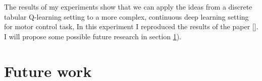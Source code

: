 \documentclass[conference]{IEEEtran}
\begin{document}
The results of my experiments show that we can apply the ideas from a discrete tabular Q-learning setting to a more complex, continuous deep learning setting for motor control task, In this experiment I reproduced the results of the paper [\cite{plappert2018multi}]. I will propose some possible future research in section \ref{sec:future_work}).

\section{Future work} \label{sec:future_work}

\newpage
\printbibliography
\end{document}
